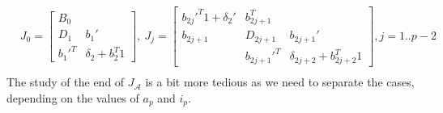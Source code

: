 \documentclass[]{article}
\newcommand{\BIN}{\begin{bmatrix}}
\newcommand{\BOUT}{\end{bmatrix}}
\begin{document}
\begin{align*}
  &J_0 = \BIN
     B_0    &                    \\
     D_1    & b_1'               \\
     b_1'^T & \delta_2 + b_2^T 1
  \BOUT, \
  J_j = \BIN
    b_{2j}'^T 1 + \delta_2' & b_{2j+1}^T  &                              \\
    b_{2j+1}                & D_{2j+1}    & b_{2j+1}'                    \\
                            & b_{2j+1}'^T & \delta_{2j+2} + b_{2j+2}^T 1 
  \BOUT, j=1..p-2\\
\end{align*}
The study of the end of $J_\mathcal{A}$ is a bit more tedious as we need to separate the cases, depending on the values of $a_p$ and $i_p$.
\end{document}
